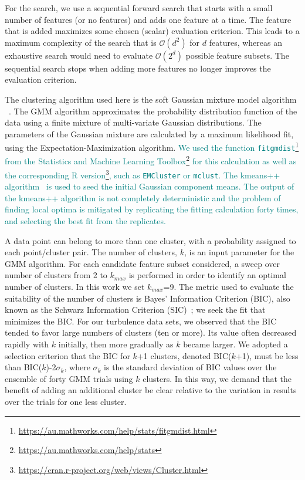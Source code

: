 For the search, we use a sequential forward search that starts with a small number of features (or no
features) and adds one feature at a time. The feature that is added maximizes some chosen (scalar)
evaluation criterion. This leads to a maximum complexity of the search that is $\mathcal{O}(d^2)$ for $d$ features, whereas an exhaustive search would need to evaluate $\mathcal{O}(2^d)$ possible feature subsets. The sequential search stops when adding more features no longer improves the evaluation criterion.

The clustering algorithm used here is the soft Gaussian mixture model algorithm ~\cite{mclachlan2004finite}. The GMM algorithm approximates the probability distribution function of the data using a ﬁnite mixture of multi-variate Gaussian distributions. The parameters of the Gaussian mixture are calculated by a maximum likelihood ﬁt, using the Expectation-Maximization algorithm. \textcolor{teal}{We used the function \texttt{fitgmdist}\footnote{\url{https://au.mathworks.com/help/stats/fitgmdist.html}} from the Statistics and Machine Learning Toolbox\footnote{\url{https://au.mathworks.com/help/stats}} for this calculation as well as the corresponding R version\footnote{\url{https://cran.r-project.org/web/views/Cluster.html}}, such as \texttt{EMCluster} or \texttt{mclust}. The kmeans++ algorithm~\cite{vassilvitskii2006k} is used to seed the initial Gaussian component means. The output of the kmeans++ algorithm is not completely deterministic and the problem of ﬁnding local optima is mitigated by replicating the ﬁtting calculation forty times, and selecting the best ﬁt from the replicates.}

A data point can belong to more than one cluster, with a probability assigned to each point/cluster pair. The number of clusters, $k$, is an input parameter for the GMM algorithm. For each candidate feature subset considered, a sweep over number of clusters from 2 to $k_{max}$ is performed in order to identify an optimal number of clusters. In this work we set $k_{max}$=9. The metric used to evaluate the suitability of the number of clusters is Bayes' Information Criterion (BIC), also known as the Schwarz Information Criterion (SIC)~\cite{schwarz1978estimating}; we seek the ﬁt that minimizes the BIC. For our turbulence data sets, we observed that the BIC tended to favor large numbers of clusters (ten or more). Its value often decreased rapidly with $k$ initially, then more gradually as $k$ became larger. We adopted a selection criterion that the BIC for $k$+1 clusters, denoted BIC($k$+1), must be less than BIC($k$)-2$\sigma_k$, where $\sigma_k$ is the standard deviation of BIC values over the ensemble of forty GMM trials using $k$ clusters. In this way, we demand that the beneﬁt of adding an additional cluster be clear relative to the variation in results over the trials for one less cluster.

